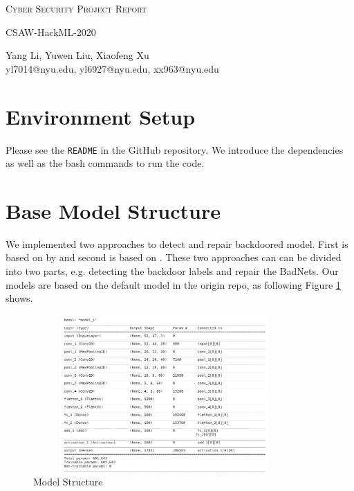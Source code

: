 \documentclass[letterpaper]{article}
\makeatletter
\newcommand{\soptitle}{Cyber Security Project Report}
\newcommand{\subtitle}{CSAW-HackML-2020}
\newcommand{\yourname}{Yang Li, Yuwen Liu, Xiaofeng Xu}
\newcommand{\youremail}{yl7014@nyu.edu, yl6927@nyu.edu, xx963@nyu.edu}
\newcommand{\amper}{{\fontspec[Scale=.95]{Adobe Caslon Pro}\selectfont\itshape\&~{}}}
\makeatother
\begin{document}
\begin{center}{\huge \scshape \soptitle}\end{center}
\begin{center}{\large \subtitle}\end{center}
\begin{center}\vspace{0.2em} {\Large \yourname\\}
  {\youremail}\end{center}

\section*{Environment Setup}
Please see the \texttt{README} in the GitHub repository\footnotemark{}. We introduce the dependencies as well as the bash commands to run the code.

\section*{Base Model Structure}
We implemented two approaches to detect and repair backdoored model. First is based on by \cite{wang2019neural} and second is based on \cite{gao2019strip}. These two approaches can can be divided into two parts, e.g. detecting the backdoor labels and repair the BadNets. Our models are based on the default model in the origin repo, as following Figure \ref{fig:base_structure} shows. 
\begin{figure}[H]
    \centering
    \includegraphics[width=10cm,  height=6cm]{img/model_structure.png}
    \caption{Model Structure}
    \label{fig:base_structure}
\end{figure}
\end{document}
